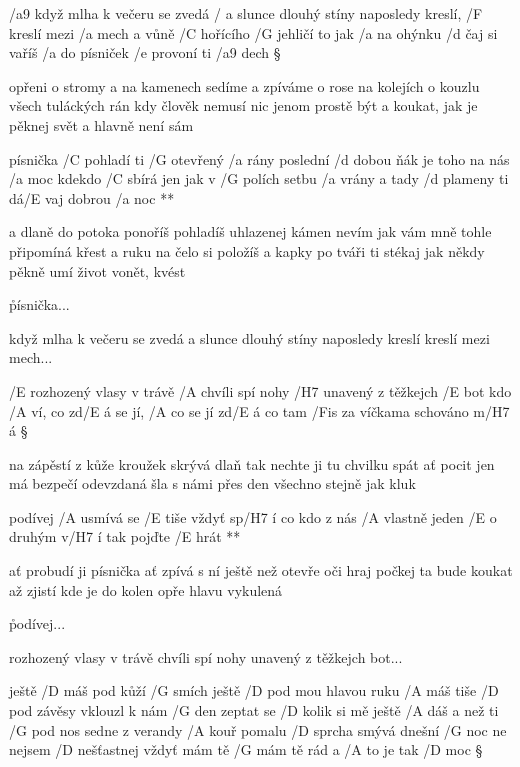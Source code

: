 



/a9 když mlha k večeru se zvedá
/ a slunce dlouhý stíny naposledy
kreslí, /F kreslí mezi /a mech
a vůně /C hořícího /G jehličí
to jak /a na ohýnku /d čaj si vaříš
/a do písniček /e provoní ti /a9 dech \S

opřeni o stromy a na kamenech
sedíme a zpíváme o rose na kolejích
o kouzlu všech tuláckých rán
kdy člověk nemusí nic jenom prostě být
a koukat, jak je pěknej svět
a hlavně není sám

\R písnička /C pohladí ti /G otevřený /a rány
   poslední /d dobou ňák je toho na nás /a moc
   kdekdo /C sbírá jen jak v /G polích setbu /a vrány
   a tady /d plameny ti dá/E vaj dobrou /a noc **

a dlaně do potoka ponoříš
pohladíš uhlazenej kámen
nevím jak vám mně tohle připomíná křest
a ruku na čelo si položíš
a kapky po tváři ti stékaj
jak někdy pěkně umí život vonět, kvést

\r písnička...

když mlha k večeru se zvedá
a slunce dlouhý stíny naposledy kreslí
kreslí mezi mech...




/E rozhozený vlasy v trávě /A chvíli spí
nohy /H7 unavený z těžkejch /E bot
kdo /A ví, co zd/E á se jí, /A co se jí zd/E á
co tam /Fis za víčkama schováno m/H7 á \S

na zápěstí z kůže kroužek skrývá dlaň
tak nechte ji tu chvilku spát
ať pocit jen má bezpečí odevzdaná
šla s námi přes den všechno stejně jak kluk

\R podívej /A usmívá se /E tiše vždyť sp/H7 í
   co kdo z nás /A vlastně jeden /E o druhým v/H7 í
   tak pojďte /E hrát **

ať probudí ji písnička ať zpívá s ní
ještě než otevře oči hraj
počkej ta bude koukat až zjistí kde je
do kolen opře hlavu vykulená

\r podívej...

rozhozený vlasy v trávě chvíli spí
nohy unavený z těžkejch bot...




ještě /D máš pod kůží /G smích
ještě /D pod mou hlavou ruku /A máš
tiše /D pod závěsy vklouzl k nám /G den
zeptat se /D kolik si mě ještě /A dáš
a než ti /G pod nos sedne z verandy /A kouř
pomalu /D sprcha smývá dnešní /G noc
ne nejsem /D nešťastnej vždyť mám tě
/G mám tě rád a /A to je tak /D moc \S

